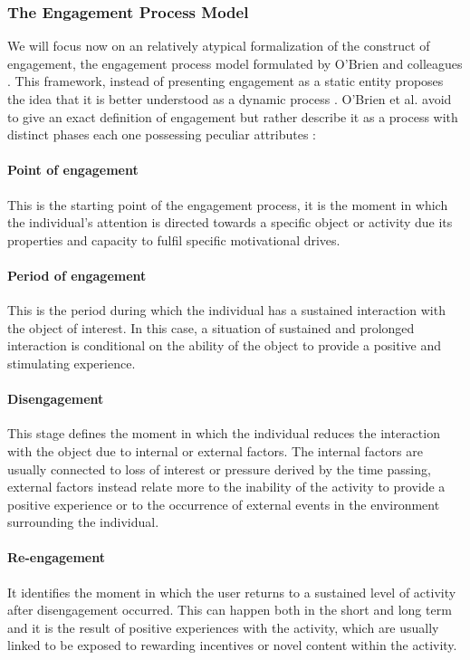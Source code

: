 \subsubsection{The Engagement Process Model}
\label{eng_proc_model}
We will focus now on an relatively atypical formalization of the construct of engagement, the engagement process model formulated by O'Brien and colleagues \cite{o2008user}. This framework, instead of presenting engagement as a static entity proposes the idea that it is better understood as a dynamic process \cite{o2008user}. O'Brien et al. avoid to give an exact definition of engagement but rather describe it as a process with distinct phases each one possessing peculiar attributes \cite{o2008user}:

\paragraph*{Point of engagement} This is the starting point of the engagement process, it is the moment in which the individual’s attention is directed towards a specific object or activity due its properties and capacity to fulfil specific motivational drives.

\paragraph*{Period of engagement} This is the period during which the individual has a sustained interaction with the object of interest. In this case, a situation of sustained and prolonged interaction is conditional on the ability of the object to provide a positive and stimulating experience.

\paragraph*{Disengagement} This stage defines the moment in which the individual reduces the interaction with the object due to internal or external factors. The internal factors are usually connected to loss of interest or pressure derived by the time passing, external factors instead relate more to the inability of the activity to provide a positive experience or to the occurrence of external events in the environment surrounding the individual.

\paragraph*{Re-engagement} It identifies the moment in which the user returns to a sustained level of activity after disengagement occurred. This can happen both in the short and long term and it is the result of positive experiences with the activity, which are usually linked to be exposed to rewarding incentives or novel content within the activity.

